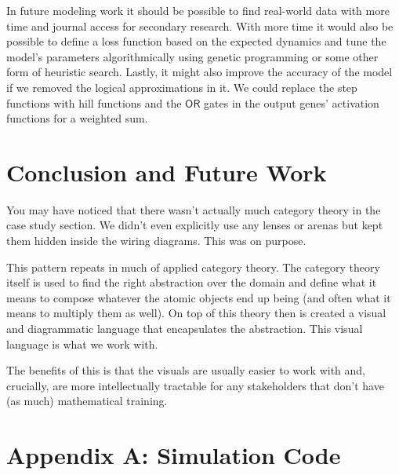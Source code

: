 \documentclass[12pt]{article}
\begin{document}
In future modeling work it should be possible to find real-world data with more time and journal access for secondary research.
With more time it would also be possible to define a loss function based on the expected dynamics and tune the model's parameters algorithmically using genetic programming or some other form of heuristic search.
Lastly, it might also improve the accuracy of the model if we removed the logical approximations in it.
We could replace the step functions with hill functions and the $\mathsf{OR}$ gates in the output genes' activation functions for a weighted sum.





\section*{Conclusion and Future Work}
You may have noticed that there wasn't actually much category theory in the case study section.
We didn't even explicitly use any lenses or arenas but kept them hidden inside the wiring diagrams.
This was on purpose.

This pattern repeats in much of applied category theory.
The category theory itself is used to find the right abstraction over the domain and define what it means to compose whatever the atomic objects end up being (and often what it means to multiply them as well).
On top of this theory then is created a visual and diagrammatic language that encapsulates the abstraction.
This visual language is what we work with.

The benefits of this is that the visuals are usually easier to work with and, crucially, are more intellectually tractable for any stakeholders that don't have (as much) mathematical training.




\nocite{*}

\pagebreak



\pagebreak
\section*{Appendix A: Simulation Code}
\end{document}
